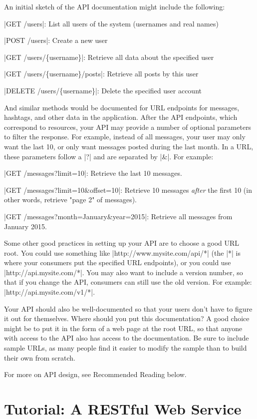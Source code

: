 \documentclass[11pt]{book}
\begin{document}
An initial sketch of the API documentation might include the following:

|GET /users|: List all users of the system (usernames and real names)

|POST /users|: Create a new user

|GET /users/\{username\}|: Retrieve all data about the specified user

|GET /users/\{username\}/posts|: Retrieve all posts by this user

|DELETE /users/\{username\}|: Delete the specified user account

And similar methods would be documented for URL endpoints for messages, hashtags, and other data in the application.  After the API endpoints, which correspond to resources, your API may provide a number of optional parameters to filter the response.  For example, instead of all messages, your user may only want the last 10, or only want messages posted during the last month.  In a URL, these parameters follow a |?| and are separated by |&|.  For example:

|GET /messages?limit=10|: Retrieve the last 10 messages.

|GET /messages?limit=10\&offset=10|: Retrieve 10 messages \emph{after} the first 10 (in other words, retrieve "page 2" of messages).

|GET /messages?month=January\&year=2015|: Retrieve all messages from January 2015.

Some other good practices in setting up your API are to choose a good URL root.  You could use something like |http://www.mysite.com/api/*| (the |*| is where your consumers put the  specified URL endpoints), or you could use |http://api.mysite.com/*|.  You may also want to include a version number, so that if you change the API, consumers can still use the old version.  For example: |http://api.mysite.com/v1/*|.

Your API should also be well-documented so that your users don't have to figure it out for themselves.  Where should you put this documentation?  A good choice might be to put it in the form of a web page at the root URL, so that anyone with access to the API also has access to the documentation.  Be sure to include sample URLs, as many people find it easier to modify the sample than to build their own from scratch.

For more on API design, see Recommended Reading below.


\section{Tutorial: A RESTful Web Service}
\end{document}
